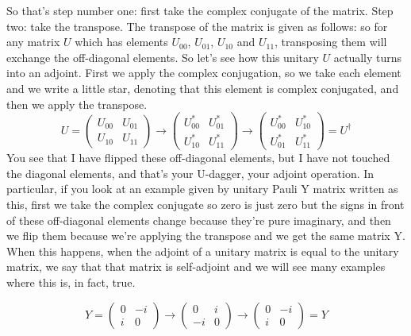 So that's step number one: first take the complex conjugate of the matrix. Step two: take the transpose. The transpose of the matrix is given as follows: so for any matrix $U$ which has elements $U_{00}$, $U_{01}$, $U_{10}$ and $U_{11}$, transposing them will exchange the off-diagonal elements. So let's see how this unitary $U$ actually turns into an adjoint. First we apply the complex conjugation, so we take each element and we write a little star, denoting that this element is complex conjugated, and then we apply the transpose.
\begin{equation}
U=\left(\begin{array}{ll}
U_{00} & U_{01} \\
U_{10} & U_{11}
\end{array}\right) \rightarrow\left(\begin{array}{cc}
U_{00}^{*} & U_{01}^{*} \\
U_{10}^{*} & U_{11}^{*}
\end{array}\right) \longrightarrow\left(\begin{array}{ll}
U_{00}^{*} & U_{10}^{*} \\
U_{01}^{*} & U_{11}^{*}
\end{array}\right)=U^{\dagger}
\end{equation}
You see that I have flipped these off-diagonal elements, but I have not touched the diagonal elements, and that's your U-dagger, your adjoint operation. In particular, if you look at an example given by unitary Pauli Y matrix written as this, first we take the complex conjugate so zero is just zero but the signs in front of these off-diagonal elements change because they're pure imaginary, and then we flip them because we're applying the transpose and we get the same matrix Y. When this happens, when the adjoint of a unitary matrix is equal to the unitary matrix, we say that that matrix is self-adjoint and we will see many examples where this is, in fact, true.

\begin{equation}
Y=\left(\begin{array}{cc}
0 & -i \\
i & 0
\end{array}\right) \longrightarrow\left(\begin{array}{cc}
0 & i \\
-i & 0
\end{array}\right) \longrightarrow\left(\begin{array}{cc}
0 & -i \\
i & 0
\end{array}\right)=Y
\end{equation}

